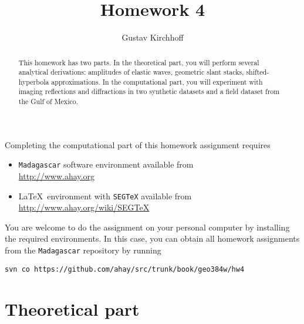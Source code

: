\author{Gustav Kirchhoff} 
\title{Homework 4}

\begin{abstract}
  This homework has two parts. In the theoretical part, you will
  perform several analytical derivations: amplitudes of elastic waves,
  geometric slant stacks, shifted-hyperbola approximations. In the
  computational part, you will experiment with imaging reflections and
  diffractions in two synthetic datasets and a field dataset from the
  Gulf of Mexico.
\end{abstract}

Completing the computational part of this homework assignment requires
\begin{itemize}
\item \texttt{Madagascar} software environment available from \\
  \url{http://www.ahay.org}
\item \LaTeX\ environment with \texttt{SEGTeX} available from \\ 
  \url{http://www.ahay.org/wiki/SEGTeX}
\end{itemize}

You are welcome to do the assignment on your personal computer by
installing the required environments. In this case, you can obtain all
homework assignments from the \texttt{Madagascar} repository by running
\begin{verbatim}
svn co https://github.com/ahay/src/trunk/book/geo384w/hw4
\end{verbatim}


\section{Theoretical part}

